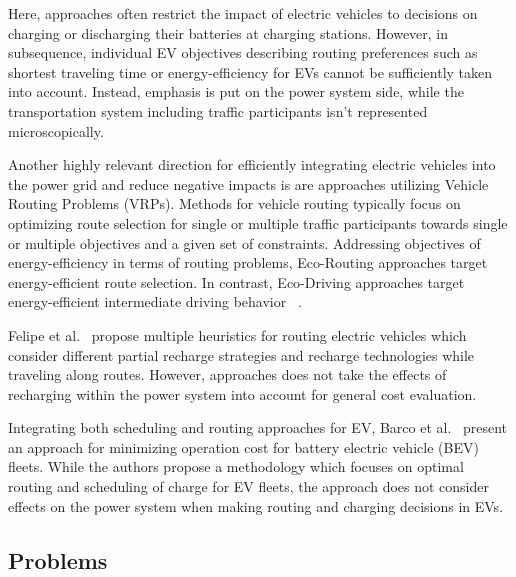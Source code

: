 Here, approaches often restrict the impact of electric vehicles to decisions on charging or discharging their batteries at charging stations. However, in subsequence, individual EV objectives describing routing preferences such as shortest traveling time or energy-efficiency for EVs cannot be sufficiently taken into account. Instead, emphasis is put on the power system side, while the transportation system including traffic participants isn't represented microscopically. 


Another highly relevant direction for efficiently integrating electric vehicles into the power grid and reduce negative impacts is are approaches utilizing Vehicle Routing Problems (VRPs). Methods for vehicle routing typically focus on optimizing route selection for single or multiple traffic participants towards single or multiple objectives and a given set of constraints. Addressing objectives of energy-efficiency in terms of routing problems, Eco-Routing approaches target energy-efficient route selection. In contrast, Eco-Driving approaches target energy-efficient intermediate driving behavior ~\cite{ericsson2006optimizing}.

Felipe et al.~\cite{felipe2014heuristic} propose multiple heuristics for routing electric vehicles which consider different partial recharge strategies and recharge technologies while traveling along routes. However, approaches does not take the effects of recharging within the power system into account for general cost evaluation. 


Integrating both scheduling and routing approaches for EV, Barco et al.~\cite{barco2013optimal} present an approach for minimizing operation cost for battery electric vehicle (BEV) fleets. While the authors propose a methodology which focuses on optimal routing and scheduling of charge for EV fleets, the approach does not consider effects on the power system when making routing and charging decisions in EVs.


\subsection{Problems}
\label{problems}

